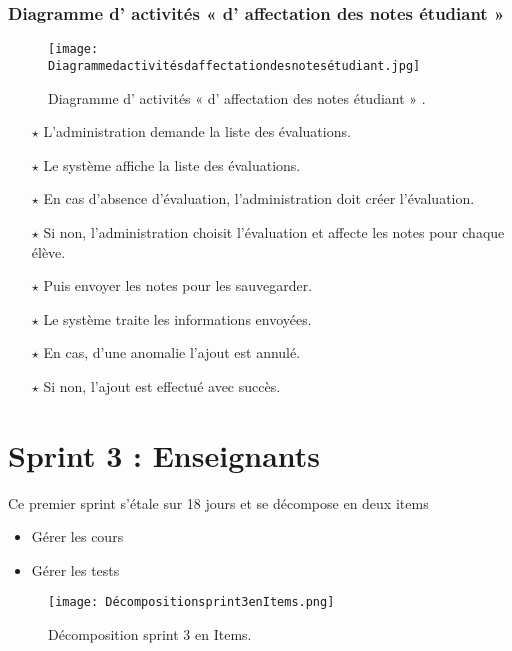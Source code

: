 \subsubsection{Diagramme d' activités « d' affectation des notes étudiant » }
\begin{figure}[ht]
	\centering
	\texttt{[image: Diagrammedactivitésdaffectationdesnotesétudiant.jpg]}
	\caption{Diagramme d' activités « d' affectation des notes étudiant » .}
	\label{fig:Diagramme d' activités  d' affectation des notes étudiant   }
\end{figure}
\FloatBarrier



	\begin{itemize}	
	
	
	
\item[$\star$] L’administration demande la liste des évaluations.
\item[$\star$] Le système affiche la liste des évaluations.
\item[$\star$] En cas d’absence d’évaluation, l’administration doit créer l’évaluation.
\item[$\star$] Si non, l’administration choisit l’évaluation et affecte les notes pour chaque élève.
\item[$\star$] Puis envoyer les notes pour les sauvegarder.
\item[$\star$] Le système traite les informations envoyées.
\item[$\star$] En cas, d’une anomalie l’ajout est annulé.
\item[$\star$] Si non, l’ajout est effectué avec succès.
	
	
	
	
\end{itemize}


\clearpage


\clearpage

\section{Sprint 3 : Enseignants }
\label{sec:conception}

\begin{fquote}
	Ce premier sprint s’étale sur 18 jours et se décompose en deux items
\end{fquote}
\smallskip
\begin{itemize}[label=$\diamond$]
	\item Gérer les cours 
	
	\item Gérer les  tests
\end{itemize}
\medskip
\medskip
\medskip
\medskip
\medskip
\medskip
\medskip
\medskip
\medskip
\medskip
\medskip
\begin{figure}[ht]
	\centering
	\texttt{[image: Décompositionsprint3enItems.png]}
	\caption{Décomposition sprint 3 en Items.}
	\label{fig:Décomposition srint 3 en Items}
\end{figure}
\FloatBarrier
\clearpage






